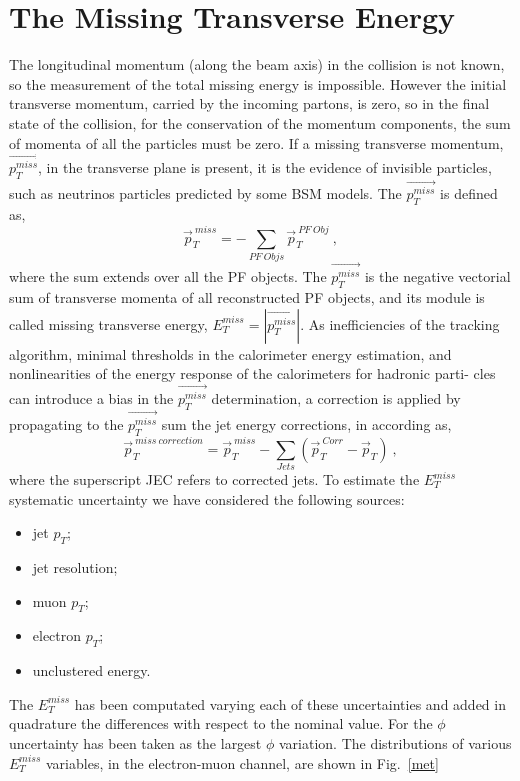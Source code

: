 \section{The Missing Transverse Energy}
The longitudinal momentum (along the beam axis) in the collision is not known, so the measurement of the total missing
energy is impossible.
However the initial transverse momentum, carried by the incoming partons, is zero, so in the final state of the collision, for the conservation of the momentum
components, the sum of momenta of all the particles must be zero.
If a missing transverse momentum, $\vec{p_T^{miss}}$, in the transverse plane is present, it is the evidence of invisible particles, such as neutrinos particles predicted by some BSM models.
The $\vec{p_T^{miss}}$ is defined as,
\begin{equation}
\vec{p}_T^{\: miss}= -\sum_{PF\: Objs} \vec{p}_T^{\:PF \: Obj} \: ,
\end{equation}
where the sum extends over all the PF objects. The $\vec{p_T^{miss}}$ is the  negative
vectorial sum of transverse momenta of all reconstructed PF objects, and its module is called missing transverse energy, $E_T^{miss}=|\vec{p_T^{miss}}|$.
As inefficiencies of the tracking algorithm, minimal thresholds in the calorimeter energy
estimation, and nonlinearities of the energy response of the calorimeters for hadronic parti-
cles can introduce a bias in the $\vec{p_T^{miss}}$ determination, a correction is applied by propagating
to the $\vec{p_T^{miss}}$ sum the jet energy corrections,  in according as,
\begin{equation}
\vec{p}_T^{\:miss \: correction}= \vec{p}_T^{\:miss} -\sum_{Jets}( \vec{p}_T^{\:Corr} -\vec{p}_T) \: ,
\end{equation}
where the superscript JEC refers to corrected jets.
To estimate the $E_T^{miss}$  systematic uncertainty we have considered the following sources:
\begin{itemize}
\item jet $p_T$;
\item jet resolution;
\item muon  $p_T$;
\item electron $p_T$;
\item unclustered energy.
\end{itemize}
The $E_T^{miss}$ has been computated varying each of these uncertainties and added in quadrature the
differences with respect to the nominal value. For the $\phi$ uncertainty has been taken as the largest
$\phi$ variation.
The distributions of various  $E_T^{miss}$ variables, in the electron-muon channel, are shown in Fig.~\ref{met}
